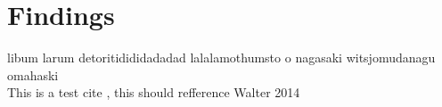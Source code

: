 \section{Findings}
libum larum detoritidididadadad lalalamothumsto o nagasaki witsjomudanagu omahaski \\
This is a test cite \cite{Walter:2014}, this should refference Walter 2014